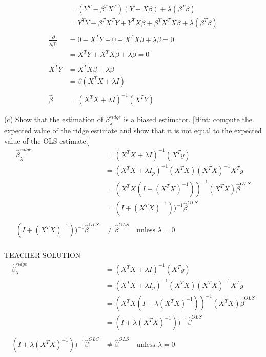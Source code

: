 \documentclass[draft]{exam} %
\theoremstyle{definition} \newtheorem*{defn}{Definition}
\begin{document}
\begin{questions}
\begin{solution}
\begin{align*}
& = ( Y^T - \beta^T X^T )( Y - X \beta ) + \lambda( \beta^T \beta ) \\
& = Y^T Y - \beta^T X^T Y + Y^T X \beta + \beta^T X^T X \beta + \lambda (
\beta^T \beta ) \\\\
\frac{\partial}{\partial \beta^T} & = 0 - X^T Y + 0 + X^T X \beta + \lambda
\beta = 0 \\
& = X^T Y + X^T X \beta + \lambda \beta = 0 \\\\
X^T Y & = X^T X \beta + \lambda \beta \\
& = \beta ( X^T X + \lambda I ) \\\\
\hat{\beta} & = ( X^T X + \lambda I )^{-1}( X^T Y )  
\end{align*}

(c) Show that the estimation of $\beta^{ridge}_\lambda$ is a biased estimator. [Hint: compute the expected value of the ridge estimate and show that it is not equal to the expected value of the OLS estimate.]
\begin{align*}
\hat{\beta}_{\lambda}^{ridge} & = ( X^T X + \lambda I )^{-1} ( X^T y ) \\
& = ( X^T X + \lambda I_p )^{-1} ( X^T X ) ( X^T X )^{-1} X^T y \\
& = ( X^T X ( I + ( X^T X )^{-1} ) )^{-1} ( X^T X ) \hat{\beta}^{OLS} \\
& = ( I + ( X^T X )^{-1} ) )^{-1} \hat{\beta}^{OLS} \\\\
( I + ( X^T X )^{-1} ) )^{-1} \hat{\beta}^{OLS} & \neq \hat{\beta}^{OLS} \quad \text{unless } \lambda = 0
\end{align*}
\\
TEACHER SOLUTION
\begin{align*}
\hat{\beta}_{\lambda}^{ridge} & = ( X^T X + \lambda I )^{-1} ( X^T y ) \\
& = ( X^T X + \lambda I_p )^{-1} ( X^T X ) ( X^T X )^{-1} X^T y \\
& = ( X^T X (  I + \lambda( X^T X )^{-1} ) )^{-1} ( X^T X ) \hat{\beta}^{OLS} \\
& = ( I + \lambda ( X^T X )^{-1} ) )^{-1} \hat{\beta}^{OLS} \\\\
( I + \lambda ( X^T X )^{-1} ) )^{-1} \hat{\beta}^{OLS} & \neq \hat{\beta}^{OLS}
\quad \text{unless } \lambda = 0
\end{align*}

\end{solution}

\end{questions} 
\end{document}
